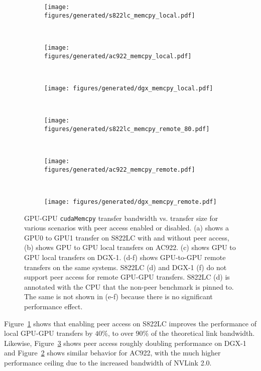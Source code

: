 \begin{figure}[H]
	\centering
	\begin{subfigure}[b]{0.3\textwidth}
		\texttt{[image: figures/generated/s822lc\_memcpy\_local.pdf]}
		\caption{}
		\label{fig:explicit-s822lc-gpu-gpu-local}
	\end{subfigure}
	~
	\begin{subfigure}[b]{0.3\textwidth}
		\texttt{[image: figures/generated/ac922\_memcpy\_local.pdf]}
		\caption{}
		\label{fig:explicit-ac922-gpu-gpu-local}
	\end{subfigure}
	~
	\begin{subfigure}[b]{0.3\textwidth}
		\texttt{[image: figures/generated/dgx\_memcpy\_local.pdf]}
		\caption{}
		\label{fig:explicit-dgx-gpu-gpu-local}
	\end{subfigure}
	\\
	\begin{subfigure}[b]{0.3\textwidth}
		\texttt{[image: figures/generated/s822lc\_memcpy\_remote\_80.pdf]}
		\caption{}
		\label{fig:explicit-s822lc-gpu-gpu-remote}
	\end{subfigure}
	~
	\begin{subfigure}[b]{0.3\textwidth}
		\texttt{[image: figures/generated/ac922\_memcpy\_remote.pdf]}
		\caption{}
		\label{fig:explicit-ac922-gpu-gpu-remote}
	\end{subfigure}
	~
	\begin{subfigure}[b]{0.3\textwidth}
		\texttt{[image: figures/generated/dgx\_memcpy\_remote.pdf]}
		\caption{}
		\label{fig:explicit-dgx-gpu-gpu-remote}
	\end{subfigure}
	\caption[GPU-GPU \texttt{cudaMemcpy} bandwidth and peer access]{
		GPU-GPU \texttt{cudaMemcpy} transfer bandwidth vs. transfer size for various scenarios with peer access enabled or disabled.
		(a) shows a GPU0 to GPU1 transfer on S822LC with and without peer access,
		(b) shows GPU to GPU local transfers on AC922.
		(c) shows GPU to GPU local transfers on DGX-1.
		(d-f) shows GPU-to-GPU remote transfers on the same systems.
		S822LC (d) and DGX-1 (f) do not support peer access for remote GPU-GPU transfers.
		S822LC (d) is annotated with the CPU that the non-peer benchmark is pinned to.
		The same is not shown in (e-f) because there is no significant performance effect.
	}
	\label{fig:explicit-peer}
\end{figure}

Figure~\ref{fig:explicit-s822lc-gpu-gpu-local} shows that enabling peer access on S822LC improves the performance of local GPU-GPU transfers by \mytilde$40$\%, to over $90$\% of the theoretical link bandwidth.
Likewise, Figure~\ref{fig:explicit-dgx-gpu-gpu-local} shows peer access roughly doubling performance on DGX-1 and Figure~\ref{fig:explicit-ac922-gpu-gpu-local} shows similar behavior for AC922, with the much higher performance ceiling due to the increased bandwidth of NVLink 2.0.

